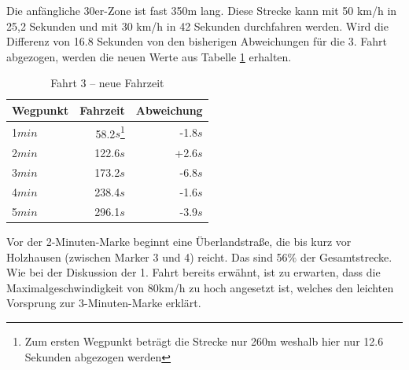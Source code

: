 Die anfängliche 30er-Zone ist fast 350m lang.
Diese Strecke kann mit 50 km/h in 25,2 Sekunden und mit 30 km/h in 42 Sekunden durchfahren werden.
Wird die Differenz von 16.8 Sekunden von den bisherigen Abweichungen für die 3. Fahrt abgezogen, werden die neuen Werte aus Tabelle \ref{tab:new3} erhalten.

\begin{table}[htb]
\centering
\caption{Fahrt 3 -- neue Fahrzeit}
\label{tab:new3}
\begin{tabular}{|l|r|r|}
\hline
Wegpunkt & Fahrzeit & Abweichung \\ \hline 
1$min$ & 58.2$s$\footnote{Zum ersten Wegpunkt beträgt die Strecke nur 260m weshalb hier nur 12.6 Sekunden abgezogen werden} & -1.8$s$  \\
2$min$ & 122.6$s$ & +2.6$s$  \\
3$min$ & 173.2$s$ & -6.8$s$  \\
4$min$ & 238.4$s$ & -1.6$s$  \\
5$min$ & 296.1$s$ & -3.9$s$  \\
\hline
\end{tabular}
\end{table}

Vor der 2-Minuten-Marke beginnt eine Überlandstraße, die bis kurz vor Holzhausen (zwischen Marker 3 und 4) reicht.
Das sind 56$\%$ der Gesamtstrecke.
Wie bei der Diskussion der 1. Fahrt bereits erwähnt, ist zu erwarten, dass die Maximalgeschwindigkeit von 80km/h zu hoch angesetzt ist, welches den leichten Vorsprung zur 3-Minuten-Marke erklärt.

